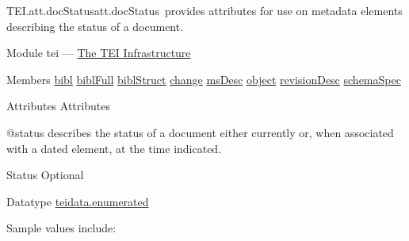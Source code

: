 \begin{reflist}
\item[]\begin{specHead}{TEI.att.docStatus}{att.docStatus} provides attributes for use on metadata elements describing the status of a document.\end{specHead} 
    \item[{Module}]
  tei — \hyperref[ST]{The TEI Infrastructure}
    \item[{Members}]
  \hyperref[TEI.bibl]{bibl} \hyperref[TEI.biblFull]{biblFull} \hyperref[TEI.biblStruct]{biblStruct} \hyperref[TEI.change]{change} \hyperref[TEI.msDesc]{msDesc} \hyperref[TEI.object]{object} \hyperref[TEI.revisionDesc]{revisionDesc} \hyperref[TEI.schemaSpec]{schemaSpec}
    \item[{Attributes}]
  Attributes\hfil\\[-10pt]\begin{sansreflist}
    \item[@status]
  describes the status of a document either currently or, when associated with a dated element, at the time indicated.
\begin{reflist}
    \item[{Status}]
  Optional
    \item[{Datatype}]
  \hyperref[TEI.teidata.enumerated]{teidata.enumerated}
    \item[{Sample values include:}]
  \begin{description}


\end{description}
\end{reflist}
\end{sansreflist}
\end{reflist}
